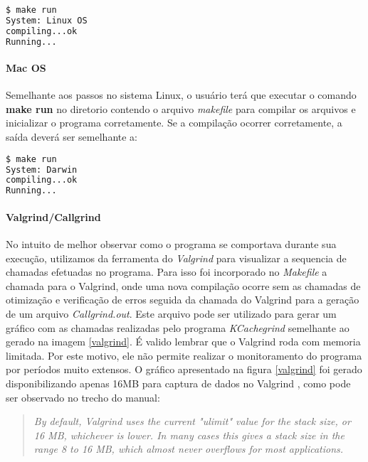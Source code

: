 \begin{lstlisting}[language=bash,title=\textit{Saída do terminal - Linux},numbers=none]
$ make run
System: Linux OS
compiling...ok
Running...
\end{lstlisting}

\paragraph{\textbf{Mac OS}}

Semelhante aos passos no sistema Linux, o usuário terá que executar o comando \textbf{make run} no diretorio contendo o arquivo \textit{makefile} para compilar os arquivos e inicializar o programa corretamente. Se a compilação ocorrer corretamente, a saída deverá ser semelhante a:

\begin{lstlisting}[language=bash,title=\textit{Saída do terminal - Mac OS},numbers=none]
$ make run
System: Darwin
compiling...ok
Running...
\end{lstlisting}


\paragraph{\textbf{Valgrind/Callgrind}}

No intuito de melhor observar como o programa se comportava durante sua execução, utilizamos da ferramenta do \textit{Valgrind} para visualizar a sequencia de chamadas efetuadas no programa.
Para isso foi incorporado no \textit{Makefile} a chamada para o Valgrind, onde uma nova compilação ocorre sem as chamadas de otimização e verificação de erros seguida da chamada do Valgrind para a geração de um arquivo \textit{Callgrind.out}. Este arquivo pode ser utilizado para gerar um gráfico com as chamadas realizadas pelo programa \textit{KCachegrind} semelhante ao gerado na imagem \ref{valgrind}. É valido lembrar que o Valgrind roda com memoria limitada. Por este motivo, ele não permite realizar o monitoramento do programa por períodos muito extensos. O gráfico apresentado na figura \ref{valgrind} foi gerado disponibilizando apenas 16MB para captura de dados no Valgrind \cite{valgrind}, como pode ser observado no trecho do manual:

\begin{quote}
	\textit{By default, Valgrind uses the current "ulimit" value for the stack size, or 16 MB, whichever is lower. In many cases this gives a stack size in the
           range 8 to 16 MB, which almost never overflows for most applications.}\cite{valgrind}
\end{quote}

